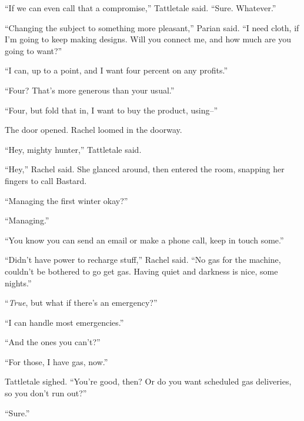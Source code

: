 ``If we can even call that a compromise,'' Tattletale said.  ``Sure.  Whatever.''



``Changing the subject to something more pleasant,'' Parian said.  ``I need cloth, if I'm going to keep making designs.  Will you connect me, and how much are you going to want?''



``I can, up to a point, and I want four percent on any profits.''



``Four?  That's more generous than your usual.''



``Four, but fold that in, I want to buy the product, using--''



The door opened.  Rachel loomed in the doorway.



``Hey, mighty hunter,'' Tattletale said.



``Hey,'' Rachel said.  She glanced around, then entered the room, snapping her fingers to call Bastard.



``Managing the first winter okay?''



``Managing.''



``You know you can send an email or make a phone call, keep in touch some.''



``Didn't have power to recharge stuff,'' Rachel said.  ``No gas for the machine, couldn't be bothered to go get gas.  Having quiet and darkness is nice, some nights.''



``\emph{True}, but what if there's an emergency?''



``I can handle most emergencies.''



``And the ones you can't?''



``For those, I have gas, now.''



Tattletale sighed.  ``You're good, then?  Or do you want scheduled gas deliveries, so you don't run out?''



``Sure.''



